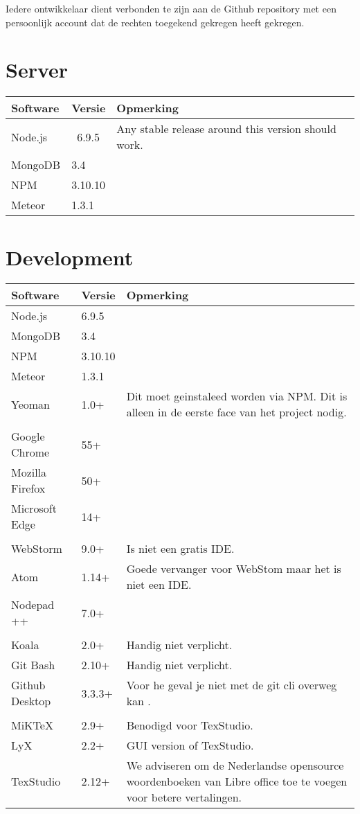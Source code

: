 \documentclass[]{report}
\begin{document}
Iedere ontwikkelaar dient verbonden te zijn aan de Github repository met een persoonlijk account dat de rechten toegekend gekregen heeft gekregen.


\section{Server}
\begin{tabular}{ l l p{6cm} }
	\textbf{Software} & \textbf{Versie} & \textbf{Opmerking} \\ \hline
	Node.js & ~6.9.5 & Any stable release around this version should work.\\
	MongoDB & 3.4 \\
	NPM & 3.10.10  \\
	Meteor & 1.3.1  \\
\end{tabular}


\section{Development}
\begin{tabular}{ l l p{6cm} }
	\textbf{Software} & \textbf{Versie} & \textbf{Opmerking} \\ \hline
	Node.js & 6.9.5  \\
	MongoDB & 3.4 \\
	NPM & 3.10.10  \\
	Meteor & 1.3.1  \\
	Yeoman & 1.0+ & Dit moet geinstaleed worden via NPM. Dit is alleen in de eerste face van het project nodig. \\
	\\
	Google Chrome & 55+ \\
	Mozilla Firefox & 50+ \\
	Microsoft Edge & 14+ \\
	\\
	WebStorm & 9.0+ & Is niet een gratis IDE. \\ 
	Atom & 1.14+ & Goede vervanger voor WebStom maar het is niet een IDE. \\
	Nodepad ++ & 7.0+ \\
	\\
	Koala & 2.0+ & Handig niet verplicht. \\ 
	Git Bash & 2.10+ & Handig niet verplicht. \\ 
	Github Desktop & 3.3.3+ & Voor he geval je niet met de git cli overweg kan .\\ 
	\\
	MiKTeX & 2.9+ & Benodigd voor TexStudio. \\ 
	LyX & 2.2+ & GUI version of TexStudio. \\
	TexStudio & 2.12+ & We adviseren om de Nederlandse opensource woordenboeken van Libre office toe te voegen voor betere vertalingen. \\
\end{tabular}
\end{document}
